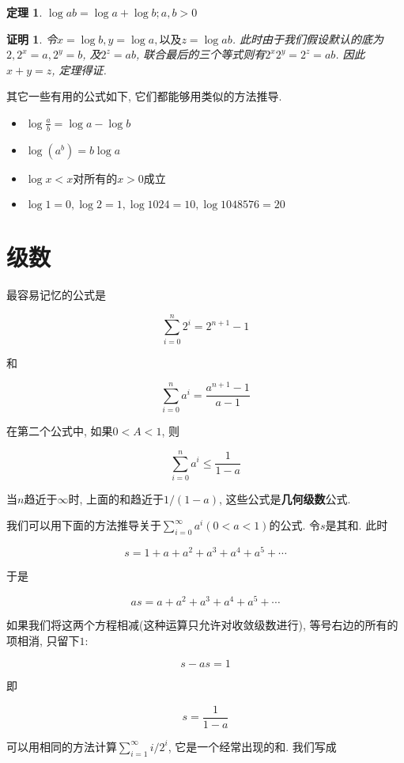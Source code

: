 \documentclass[oneside,10pt,fontset=none]{ctexbook}
\numberwithin{definition}{chapter}
\newtheorem{theorem}{定理}
\numberwithin{theorem}{chapter}
\numberwithin{lemma}{chapter}
\newtheorem*{myproof}{证明}
\begin{document}
\begin{theorem}
    $\log{ab} = \log{a} + \log{b}; a,b > 0$
\end{theorem}

\begin{myproof}
    令$x=\log{b}, y=\log{a}, \text{以及}z=\log{ab}$. 此时由于我们假设默认的底为$2, 2^x=a, 2^y = b$, 及$2^z=ab$, 联合最后的三个等式则有$2^x2^y=2^z=ab$. 因此$x+y=z$, 定理得证.
\end{myproof}

其它一些有用的公式如下, 它们都能够用类似的方法推导.

\begin{itemize}
    \item $\log{\frac{a}{b}} = \log{a} - \log{b}$
    \item $\log{(a^b)} = b\log{a}$
    \item $\log{x} < x \text{对所有的} x > 0 \text{成立}$
    \item $\log{1} = 0, \log{2}=1, \log{1024}=10, \log{1048576}=20$
\end{itemize}

\section{级数}

最容易记忆的公式是

$$
\sum_{i=0}^{n}2^i = 2^{n+1} - 1
$$

和

$$
\sum_{i=0}^{n}a^i = \frac{a^{n+1}-1}{a-1}
$$

在第二个公式中, 如果$0<A<1$, 则

$$
\sum_{i=0}^{n}a^i \le \frac{1}{1-a}
$$

当$n$趋近于$\infty$时, 上面的和趋近于$1/(1-a)$, 这些公式是\textbf{几何级数}公式.

我们可以用下面的方法推导关于$\sum_{i=0}^{\infty}a^i(0<a<1)$的公式. 令$s$是其和. 此时

$$
s=1+a+a^2+a^3+a^4+a^5+\cdots
$$

于是

$$
as=a+a^2+a^3+a^4+a^5+\cdots
$$

如果我们将这两个方程相减(这种运算只允许对收敛级数进行), 等号右边的所有的项相消, 只留下$1$:

$$
s-as=1
$$

即

$$
s=\frac{1}{1-a}
$$

可以用相同的方法计算$\sum_{i=1}^{\infty}i/2^i$, 它是一个经常出现的和. 我们写成
\end{document}
